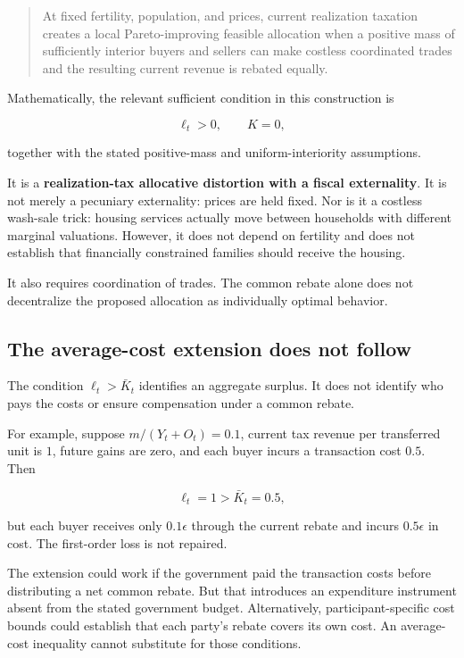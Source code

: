 \documentclass[11pt,letterpaper]{article}
\begin{document}
\begin{quote}
At fixed fertility, population, and prices, current realization taxation creates a local
Pareto-improving feasible allocation when a positive mass of sufficiently interior buyers
and sellers can make costless coordinated trades and the resulting current revenue is
rebated equally.
\end{quote}

Mathematically, the relevant sufficient condition in this construction is

\[
\ell_t>0,\qquad K=0,
\]

together with the stated positive-mass and uniform-interiority assumptions.

It is a \textbf{realization-tax allocative distortion with a fiscal externality}. It is
not merely a pecuniary externality: prices are held fixed. Nor is it a costless wash-sale
trick: housing services actually move between households with different marginal
valuations. However, it does not depend on fertility and does not establish that
financially constrained families should receive the housing.

It also requires coordination of trades. The common rebate alone does not decentralize the
proposed allocation as individually optimal behavior.

\subsection{The average-cost extension does not
follow}\label{the-average-cost-extension-does-not-follow}

The condition \(\ell_t>\bar K_t\) identifies an aggregate surplus. It does not identify
who pays the costs or ensure compensation under a common rebate.

For example, suppose \(m/(Y_t+O_t)=0.1\), current tax revenue per transferred unit is
\(1\), future gains are zero, and each buyer incurs a transaction cost \(0.5\). Then

\[
\ell_t=1>\bar K_t=0.5,
\]

but each buyer receives only \(0.1\epsilon\) through the current rebate and incurs
\(0.5\epsilon\) in cost. The first-order loss is not repaired.

The extension could work if the government paid the transaction costs before distributing
a net common rebate. But that introduces an expenditure instrument absent from the stated
government budget. Alternatively, participant-specific cost bounds could establish that
each party's rebate covers its own cost. An average-cost inequality cannot substitute for
those conditions.
\end{document}
